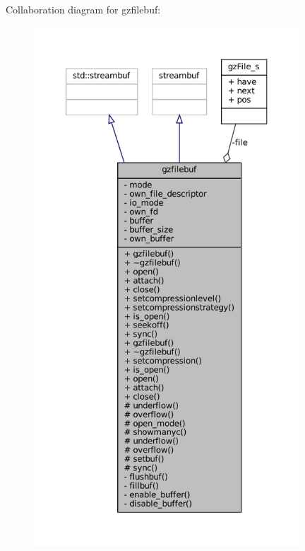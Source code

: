Collaboration diagram for gzfilebuf\+:
\nopagebreak
\begin{figure}[H]
\begin{center}
\leavevmode
\includegraphics[height=550pt]{classgzfilebuf__coll__graph}
\end{center}
\end{figure}
